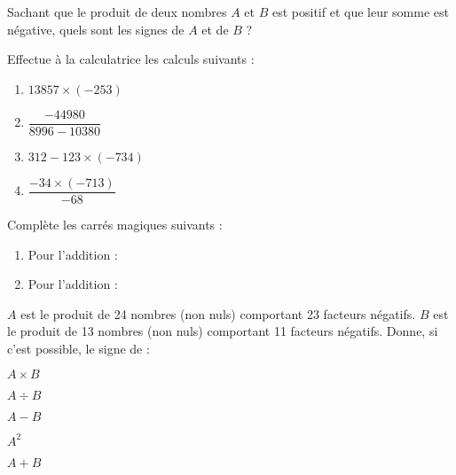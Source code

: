 \begin{exercice}[Énigme]
Sachant que le produit de deux nombres $A$ et $B$ est positif et que leur somme est négative, quels sont les signes de $A$ et de $B$ ?
\end{exercice}



\begin{exercice}[Calculatrice]
Effectue à la calculatrice les calculs suivants :
\begin{enumerate}
\item $13 857 \times (-253)$
\item $\dfrac{-44980}{8996-10380}$
\item $312 -123 \times (-734)$
\item $\dfrac{-34 \times (-713)}{-68}$
\end{enumerate}
\end{exercice}



\begin{exercice}
Complète les carrés magiques suivants :
\begin{enumerate}
\item Pour l'addition :

\begin{center}
\end{center}

\item Pour l'addition :

\begin{center}
\end{center}

\end{enumerate}
\end{exercice}


\begin{exercice}[Signe]
$A$ est le produit de 24 nombres (non nuls) comportant 23 facteurs négatifs.
$B$ est le produit de 13 nombres (non nuls) comportant 11 facteurs négatifs. 
Donne, si c'est possible, le signe de :
\begin{colenumerate}{2}
\item $A \times B$
\item $A \div B$
\item $A -B$ 
\item $A^2$
\item $A + B$
\end{colenumerate}
\end{exercice}



